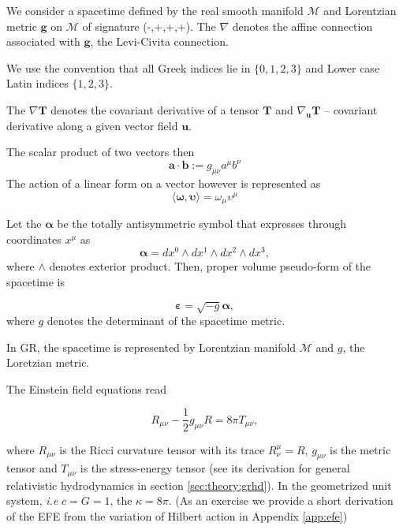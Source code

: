 \documentclass[11pt,a4paper,headinclude=true,DIV=14,BCOR=8mm,chapterprefix,listof=totoc,twoside,openright,abstracton]{scrbook}
\begin{document}
We consider a spacetime defined by the real smooth manifold $\mathcal{M}$ and Lorentzian metric $\boldsymbol{g}$ on $\mathcal{M}$ of signature (-,+,+,+). The $\nabla$ denotes the affine connection associated with $\boldsymbol{g}$, the Levi-Civita connection. 

We use the convention that all Greek indices lie in $\{0, 1, 2, 3\}$ and Lower case Latin indices $\{1, 2, 3\}$. 

The $\nabla\boldsymbol{T}$ denotes the covariant derivative of a tensor $\boldsymbol{T}$ and $\nabla_{\boldsymbol{u}}\boldsymbol{T}$ -- covariant derivative along a given vector field $\boldsymbol{u}$.

The scalar product of two vectors then 
\begin{equation*}
    \boldsymbol{a}\cdot\boldsymbol{b}:=g_{\mu\nu}a^{\mu}b^{\nu}
\end{equation*}
The action of a linear form on a vector however is represented as 
\begin{equation*}
    \langle\boldsymbol{\omega},\boldsymbol{\upsilon}\rangle=\omega_{\mu}\upsilon^{\mu}
\end{equation*}

Let the $\boldsymbol{\alpha}$ be the totally antisymmetric symbol that expresses through coordinates $x^{\mu}$ as
\begin{equation*}
    \boldsymbol{\alpha} = dx^0 \wedge dx^1 \wedge dx^2 \wedge dx^3,
\end{equation*}
where $\wedge$ denotes exterior product. Then, proper volume pseudo-form of the spacetime is

\begin{equation*}
    \boldsymbol{\varepsilon} = \sqrt{-g}\boldsymbol{\alpha},
\end{equation*}
where $g$ denotes the determinant of the spacetime metric. 

In GR, the spacetime is represented by Lorentzian manifold $\mathcal{M}$ and $g$, the Loretzian metric. 

The Einstein field equations read 

\begin{equation}
    R_{\mu\nu} -\frac{1}{2}g_{\mu\nu}R=8\pi T_{\mu\nu},
    \label{eq:theory:EFE}
\end{equation}

where $R_{\mu\nu}$ is the Ricci curvature tensor with its trace $R^{\mu}_{\nu}=R$, $g_{\mu\nu}$ is the metric tensor and $T_{\mu\nu}$ is the stress-energy tensor (see its derivation for general relativistic hydrodynamics in section \ref{sec:theory:grhd}).
In the geometrized unit system, \textit{i.e} $c=G=1$, the $\kappa=8\pi$.
(As an exercise we provide a short derivation of the EFE from the variation of Hilbert action in Appendix \ref{app:efe})
\end{document}
